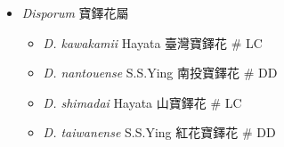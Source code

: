 
  \begin{itemize}
 \item[] \textit{Disporum} 寶鐸花屬
                                
  \begin{itemize}
        \item[] \textit{D. kawakamii} Hayata  臺灣寶鐸花  \# LC
        \item[] \textit{D. nantouense} S.S.Ying  南投寶鐸花  \# DD
        \item[] \textit{D. shimadai} Hayata  山寶鐸花  \# LC
        \item[] \textit{D. taiwanense} S.S.Ying  紅花寶鐸花  \# DD
  \end{itemize}
  \end{itemize}
